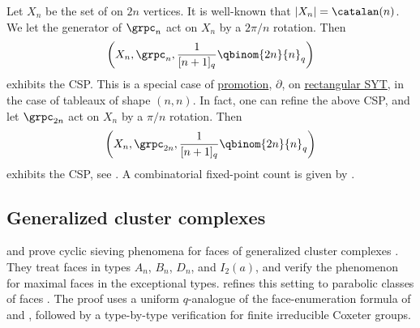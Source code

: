 Let $X_n$ be the set of
\label{nonCrossingMatchingCSP} on $2n$ vertices.
It is well-known that $|X_n| = \catalan(n)$.
We let the generator of $\grpc_n$ act on $X_n$ by a $2\pi/n$ rotation.
Then
\[
\left( X_{n}, \grpc_n,  \frac{1}{[n+1]_q}\qbinom{2n}{n}_q \right)
\]
exhibits the CSP.
This is a special case of \hyperref[promotion]{promotion}, $\partial$, on
\hyperref[cspRectangularSYT]{rectangular SYT}, in the case of tableaux of shape
$(n,n)$.
In fact, one can refine the above CSP, and let $\grpc_{2n}$ act on $X_n$ by a
$\pi/n$ rotation.
Then
\[
\left( X_{n}, \grpc_{2n},  \frac{1}{[n+1]_q}\qbinom{2n}{n}_q \right)
\]
exhibits the CSP, see \cite{PetersenPylyavskyyRhoades2008}.
A combinatorial fixed-point count is given by 
\cite{Earnest2018NoncrossingMatchings}.

\subsection[cspGeneralizedClusterComplexes]{Generalized cluster complexes}

 and  prove cyclic sieving phenomena for
faces of generalized cluster complexes \cite{EuFu2008}.  They treat faces in
types $A_n$, $B_n$, $D_n$, and $I_2(a)$, and verify the phenomenon for
maximal faces in the exceptional types.
 refines this setting to parabolic classes of faces
\cite{Pouillart2026x}.  The proof uses a uniform $q$-analogue of the
face-enumeration formula of  and
, followed by a
type-by-type verification for finite irreducible Coxeter groups.


